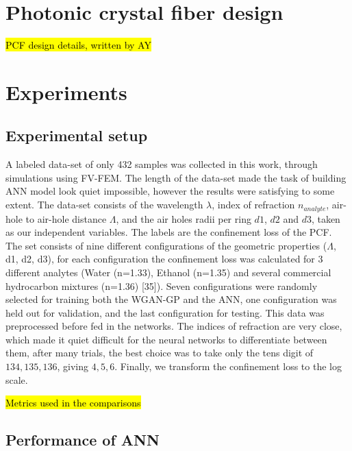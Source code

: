 \documentclass[draft, a4, 10pt, onecolumn]{IEEEtran}
\begin{document}
\section{Photonic crystal fiber design}
\label{sec:pcf}

\hl{PCF design details, written by AY}

\section{Experiments}
\label{sec:exp}

\subsection{Experimental setup}

A labeled data-set of only 432 samples was collected in this work, through simulations using FV-FEM. The length of the data-set made the task of building ANN model look quiet impossible, however the results were satisfying to some extent. The data-set consists of the wavelength $\lambda$, index of refraction $n_{analyte} $, air-hole to air-hole distance $ \Lambda $, and the air holes radii per ring $d1$, $d2$ and $d3$, taken as our independent variables. The labels are the confinement loss of the PCF. The set consists of nine different configurations of the geometric properties ($ \Lambda $, d1, d2, d3), for each configuration the confinement loss was calculated for 3 different analytes (Water (n=1.33), Ethanol (n=1.35) and several commercial hydrocarbon mixtures (n=1.36) [35]). Seven configurations were randomly selected for training both the WGAN-GP and the ANN, one configuration was held out for validation, and the last configuration for testing. This data was preprocessed before fed in the networks. The indices of refraction  are very close, which made it quiet difficult for the neural networks to differentiate between them, after many trials, the best choice was to take only the tens digit of ${134, 135, 136}$, giving ${4, 5, 6}$. Finally, we transform the confinement loss to the log scale.

\hl{Metrics used in the comparisons}


\subsection{Performance of ANN}
\end{document}
